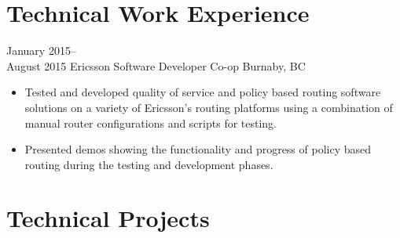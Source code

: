 \documentclass[]{friggeri-cv} %
\begin{document}
\section{Technical Work Experience}

\begin{entrylist}

\entry
{January 2015--\\August 2015}
{Ericsson {\normalfont Software Developer Co-op}}
{Burnaby, BC}
{
\begin{itemize}
\item Tested and developed quality of service and policy based routing software
  solutions on a variety of Ericsson's routing platforms using a combination of manual
  router configurations and scripts for testing.
\item Presented demos showing the functionality and progress of policy based
  routing during the testing and development phases.
\end{itemize}
}
\end{entrylist}

\section{Technical Projects}
\end{document}
